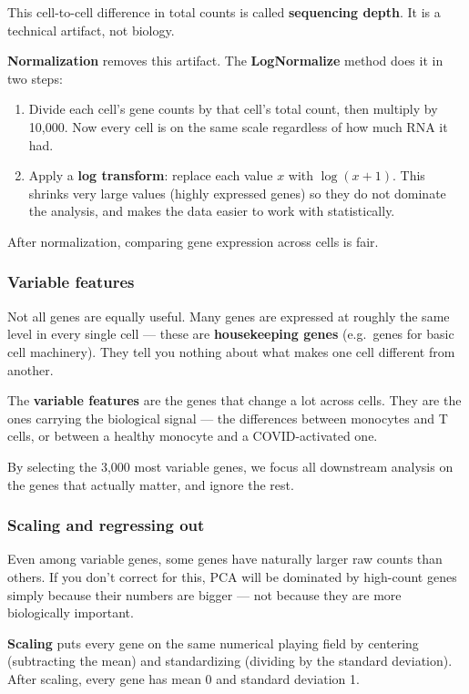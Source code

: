 \documentclass[11pt, a4paper]{article}
\begin{document}
This cell-to-cell difference in total counts is called \textbf{sequencing depth}.
It is a technical artifact, not biology.

\textbf{Normalization} removes this artifact.
The \textbf{LogNormalize} method does it in two steps:
\begin{enumerate}[nosep]
  \item Divide each cell's gene counts by that cell's total count, then multiply by 10,000.
        Now every cell is on the same scale regardless of how much RNA it had.
  \item Apply a \textbf{log transform}: replace each value $x$ with $\log(x + 1)$.
        This shrinks very large values (highly expressed genes) so they do not
        dominate the analysis, and makes the data easier to work with statistically.
\end{enumerate}

After normalization, comparing gene expression across cells is fair.

\subsubsection{Variable features}

Not all genes are equally useful. Many genes are expressed at roughly the
same level in every single cell — these are \textbf{housekeeping genes} (e.g.\ genes
for basic cell machinery). They tell you nothing about what makes one cell different
from another.

The \textbf{variable features} are the genes that change a lot across cells.
They are the ones carrying the biological signal — the differences between
monocytes and T cells, or between a healthy monocyte and a COVID-activated one.

By selecting the 3,000 most variable genes, we focus all downstream analysis on
the genes that actually matter, and ignore the rest.

\subsubsection{Scaling and regressing out}

Even among variable genes, some genes have naturally larger raw counts than others.
If you don't correct for this, PCA will be dominated by high-count genes simply
because their numbers are bigger — not because they are more biologically important.

\textbf{Scaling} puts every gene on the same numerical playing field by centering
(subtracting the mean) and standardizing (dividing by the standard deviation).
After scaling, every gene has mean 0 and standard deviation 1.
\end{document}
